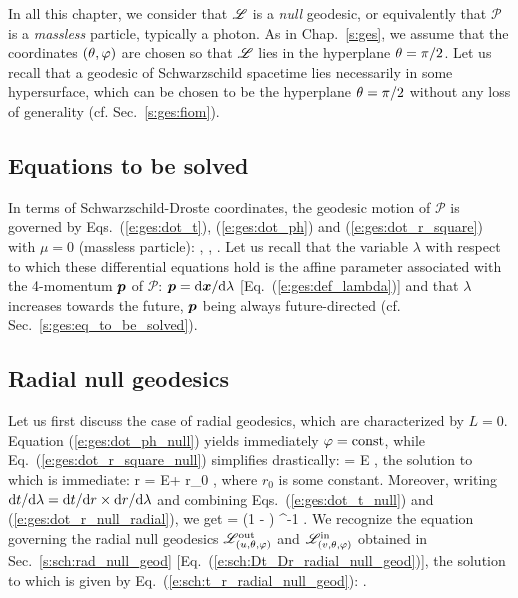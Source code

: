 In all this chapter, we consider that $\mathscr{L}$ is a \emph{null}
geodesic, or equivalently that
$\mathscr{P}$ is a \emph{massless} particle, typically a photon.
As in Chap.~\ref{s:ges}, we assume that the coordinates $(\theta,\varphi)$ are chosen
so that $\mathscr{L}$ lies in the hyperplane $\theta=\pi/2$. Let us recall that
a geodesic of Schwarzschild spacetime lies necessarily in some hypersurface, which
can be chosen to be the hyperplane $\theta=\pi/2$ without any loss of generality
(cf. Sec.~\ref{s:ges:fiom}).

\subsection{Equations to be solved}

In terms of Schwarzschild-Droste coordinates, the geodesic motion of $\mathscr{P}$ is governed by Eqs.~(\ref{e:ges:dot_t}), (\ref{e:ges:dot_ph}) and (\ref{e:ges:dot_r_square})
with $\mu=0$ (massless particle):
\be \label{e:ges:dot_t_null}
    ,
\ee
\be \label{e:ges:dot_ph_null}
   ,
\ee
\be \label{e:ges:dot_r_square_null}
   .
\ee
Let us recall that the variable $\lambda$ with respect to which these differential equations
hold
is the affine parameter associated with the 4-momentum $\bm{p}$ of $\mathscr{P}$:
$\bm{p} = \mathrm{d}\bm{x}/\mathrm{d}\lambda$ [Eq.~(\ref{e:ges:def_lambda})] and that
$\lambda$ increases towards the future,
$\bm{p}$ being always future-directed (cf. Sec.~\ref{s:ges:eq_to_be_solved}).

\subsection{Radial null geodesics} \label{s:gis:radial}

Let us first discuss the case of radial geodesics, which are characterized by $L=0$.
Equation (\ref{e:ges:dot_ph_null}) yields immediately $\varphi=\mathrm{const}$,
while Eq.~(\ref{e:ges:dot_r_square_null}) simplifies drastically:
\be \label{e:ges:dot_r_null_radial}
     = \pm E ,
\ee
the solution to which is immediate:
\be \label{e:ges:r_lambda_radial_null}
    r = \pm E\lambda + r_0 ,
\ee
where $r_0$ is some constant.
Moreover, writing $\mathrm{d} t/\mathrm{d}\lambda = \mathrm{d} t/\mathrm{d} r \times \mathrm{d} r/\mathrm{d}\lambda$
and combining Eqs.~(\ref{e:ges:dot_t_null}) and (\ref{e:ges:dot_r_null_radial}),
we get
\be \label{e:gis:dtdr_radial_geod}
     = \pm \left(1 -  \right) ^{-1} .
\ee
We recognize the equation governing the radial null geodesics
$\mathscr{L}^{\rm out}_{(u,\theta,\varphi)}$ and $\mathscr{L}^{\rm in}_{(v,\theta,\varphi)}$
obtained in
Sec.~\ref{s:sch:rad_null_geod} [Eq.~(\ref{e:sch:Dt_Dr_radial_null_geod})],
the solution to which is given by Eq.~(\ref{e:sch:t_r_radial_null_geod}):
\be
   .
\ee

